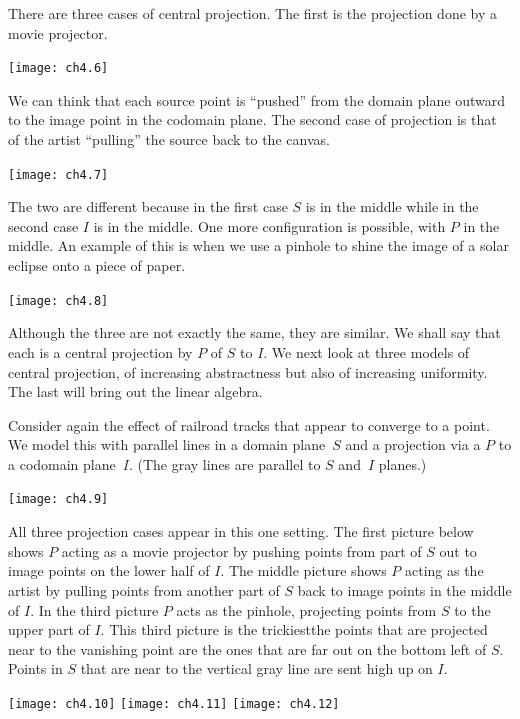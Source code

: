 There are three cases of central projection.
The first is the projection done by a movie projector.
\begin{center}
  \texttt{[image: ch4.6]}
\end{center}
We can think that each source point is ``pushed'' from the domain plane 
outward to the image point in the codomain plane.
The second case of projection is that of the artist
``pulling'' the source back to the canvas.
\begin{center}
  \texttt{[image: ch4.7]}
\end{center}
The two are different because in the first case $S$ is in the middle
while in the second case $I$ is in the middle.
One more configuration is possible, with $P$ in the middle. 
An example of this is when we use a pinhole to shine the 
image of a solar eclipse onto a piece of paper.
\begin{center}
  \texttt{[image: ch4.8]}
\end{center}

Although the three are not exactly the same,  
they are similar.
We shall say that 
each is a central projection by $P$ of
$S$ to $I$.
We next look at three models of central projection, 
of increasing abstractness but
also of increasing uniformity.
The last will bring out the linear algebra.

Consider again the effect of railroad tracks  
that appear to converge to a point.
We model this with parallel lines in a domain plane~$S$
and a projection via a $P$ to a codomain plane~$I$. 
(The gray lines are parallel to $S$ and~$I$ planes.)
\begin{center}
  \texttt{[image: ch4.9]}
\end{center}
All three projection cases appear in this one setting.
The first picture below shows $P$ acting as a movie projector by pushing
points from part of $S$ out to image points on the lower half of $I$.
The middle picture shows $P$ acting as the artist by 
pulling points from another part of $S$ back to  
image points in the middle of $I$.
In the third picture $P$ acts as the pinhole, projecting points from $S$
to the upper part of $I$.
This third picture is the trickiest\Dash the points that are
projected near to the vanishing point are the ones that are 
far out on the bottom left of $S$. 
Points in $S$ that are near to the vertical gray line
are sent high up on $I$.
\begin{center}
  \texttt{[image: ch4.10]}
\hfil
  \texttt{[image: ch4.11]}
\hfil
  \texttt{[image: ch4.12]}
\end{center}

